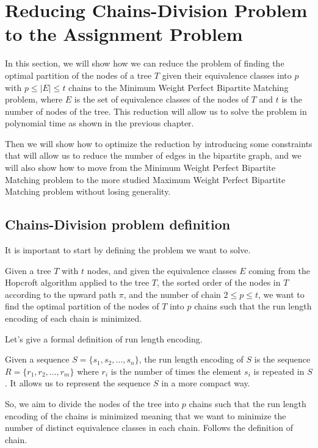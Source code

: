 \section{Reducing Chains-Division Problem to the Assignment Problem}
In this section, we will show how we can reduce the problem of finding the optimal partition of the nodes of a tree $T$ given their equivalence classes into $p$ with $p \leq |E| \leq t$ chains to the Minimum Weight Perfect Bipartite Matching problem, where $E$ is the set of equivalence classes of the nodes of $T$ and $t$ is the number of nodes of the tree. This reduction will allow us to solve the problem in polynomial time as shown in the previous chapter.

Then we will show how to optimize the reduction by introducing some constraints that will allow us to reduce the number of edges in the bipartite graph, and we will also show how to move from the Minimum Weight Perfect Bipartite Matching problem to the more studied Maximum Weight Perfect Bipartite Matching problem without losing generality.

\subsection{Chains-Division problem definition}
It is important to start by defining the problem we want to solve.

\begin{definition} \label{def:problem_def}
    Given a tree $T$ with $t$ nodes, and given the equivalence classes $E$ coming from the Hopcroft algorithm applied to the tree $T$, the sorted order of the nodes in $T$ according to the upward path $\pi$, and the number of chain $2 \leq p \leq t$, we want to find the optimal partition of the nodes of $T$ into $p$ chains such that the run length encoding of each chain is minimized.
\end{definition}

Let's give a formal definition of run length encoding.
\begin{definition}
    Given a sequence $S = \{s_1, s_2, \dots, s_n\}$, the run length encoding of $S$ is the sequence $R = \{r_1, r_2, \dots, r_m\}$ where $r_i$ is the number of times the element $s_i$ is repeated in $S$. It allows us to represent the sequence $S$ in a more compact way.
\end{definition}

So, we aim to divide the nodes of the tree into $p$ chains such that the run length encoding of the chains is minimized meaning that we want to minimize the number of distinct equivalence classes in each chain. Follows the definition of chain.

